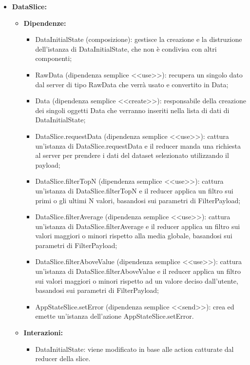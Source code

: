 \begin{itemize}
    \item \textbf{DataSlice:}
    \begin{itemize}
        \item \textbf{Dipendenze:}
        \begin{itemize}
            \item DataInitialState (composizione): gestisce la creazione e la distruzione dell'istanza di DataInitialState, che non è condivisa con altri componenti;
            \item RawData (dipendenza semplice <<use>>): recupera un singolo dato dal server di tipo RawData che verrà usato e convertito in Data;
            \item Data (dipendenza semplice <<create>>): responsabile della creazione dei singoli oggetti Data che verranno inseriti nella lista di dati di DataInitialState;
            \item DataSlice.requestData (dipendenza semplice <<use>>): cattura un'istanza di DataSlice.requestData e il reducer manda una richiesta al server per prendere i dati del dataset selezionato utilizzando il payload;
            \item DataSlice.filterTopN (dipendenza semplice <<use>>): cattura un'istanza di DataSlice.filterTopN e il reducer applica un filtro sui primi o gli ultimi N valori, basandosi sui parametri di FilterPayload;
            \item DataSlice.filterAverage (dipendenza semplice <<use>>): cattura un’istanza di DataSlice.filterAverage e il reducer applica un filtro sui valori maggiori o minori rispetto alla media globale, basandosi sui parametri di FilterPayload;
            \item DataSlice.filterAboveValue (dipendenza semplice <<use>>): cattura un’istanza di DataSlice.filterAboveValue e il reducer applica un filtro sui valori maggiori o minori rispetto ad un valore deciso dall'utente, basandosi sui parametri di FilterPayload;
            \item AppStateSlice.setError (dipendenza semplice <<send>>): crea ed emette un’istanza dell’azione AppStateSlice.setError.
        \end{itemize} 
        \item \textbf{Interazioni:}
        \begin{itemize}
            \item DataInitialState: viene modificato in base alle action catturate dal reducer della slice.
        \end{itemize} 

\end{itemize}
\end{itemize}
